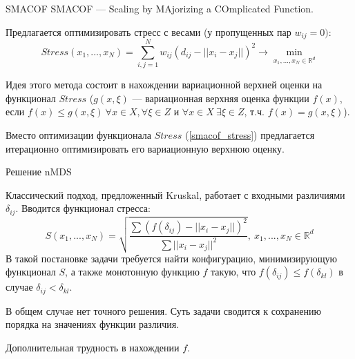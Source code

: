 \documentclass[9pt]{beamer}
\begin{document}
\begin{frame}{SMACOF}
    SMACOF --- Scaling by MAjorizing a COmplicated Function.
    
    Предлагается оптимизировать стресс с весами (у пропущенных пар $w_{ij} = 0)$:
    \begin{equation}
    \label{smacof_stress}
    Stress(x_1, ..., x_N) = \sum_{i, j=1}^N  w_{ij}(d_{ij} - || x_i - x_j ||)^2 \longrightarrow \min_{x_1, ..., x_N \in \mathbb{R}^d}
\end{equation}

Идея этого метода состоит в нахождении вариационной верхней оценки на функционал $Stress$ ($g(x, \xi)$ --- вариационная верхняя оценка функции $f(x)$, если $f(x) \leqslant g(x, \xi) \: \forall x \in X, \forall \xi \in Z$ и $\forall x \in X \: \exists \xi \in Z$, т.ч. $f(x) = g(x, \xi)$). 
\vspace{\baselineskip} 

Вместо оптимизации функционала $Stress$ (\ref{smacof_stress}) предлагается итерационно оптимизировать его вариационную верхнюю оценку. 
\end{frame}

\begin{frame}{Решение nMDS}

Классический подход, предложенный Kruskal, работает с входными различиями $\delta_{ij}$. Вводится функционал стресса:
\begin{equation}
    \label{nmdsstress1}
        S(x_1, ..., x_N) = \sqrt{\dfrac{\sum(f(\delta_{ij}) - ||x_i - x_j||)^2}{\sum ||x_i - x_j||^2}}, \: x_1, ..., x_N \in \mathbb{R}^d
\end{equation}
В такой постановке задачи требуется найти конфигурацию, минимизирующую функционал $S$, а также монотонную функцию $f$ такую, что $f(\delta_{ij}) \leqslant f(\delta_{kl})$ в случае $\delta_{ij} < \delta_{kl}$.
\vspace{\baselineskip} 

В общем случае нет точного решения. Суть задачи сводится к сохранению порядка на значениях функции различия.
\vspace{\baselineskip} 

Дополнительная трудность в нахождении $f$.
    
\end{frame}
\end{document}
